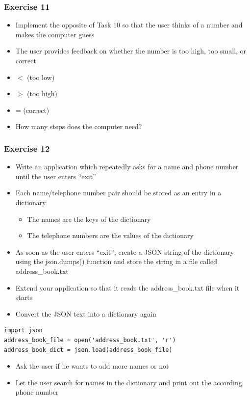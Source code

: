 \documentclass[10pt, a4paper]{beamer} %
\begin{document}
{\begin{frame}[c, fragile]
\end{frame}

\begin{frame}[c, fragile]\frametitle{Exercise 11}
    
    \begin{itemize}
        \item Implement the opposite of Task 10 so that the user thinks of a number and makes the computer guess
        \item The user provides feedback on whether the number is too high, too small, or correct
        \item $<$ (too low)
        \item $>$ (too high)
        \item = (correct)
        \item How many steps does the computer need?
    \end{itemize}
\end{frame}


\begin{frame}\frametitle{Exercise 12}
    
\begin{itemize}
\item Write an application which repeatedly asks for a name and phone
number until the user enters ``exit''
\item Each name/telephone number pair should be stored as an entry in a dictionary
\begin{itemize}
    \item The names are the keys of the dictionary
    \item The telephone numbers are the values of the dictionary
\end{itemize}
\item As soon as the user enters ``exit'', create a JSON string of the dictionary using the json.dumps() function and store the string in a file called address\_book.txt
\end{itemize}

\framebreak

\begin{itemize}
\item Extend your application so that it reads the address\_book.txt file when it starts
\item Convert the JSON text into a dictionary again
\end{itemize}

{
\mdseries
{}
\begin{lstlisting}
import json
address_book_file = open('address_book.txt', 'r')
address_book_dict = json.load(address_book_file)
\end{lstlisting}
}

\begin{itemize}
\item Ask the user if he wants to add more names or not
\item Let the user search for names in the dictionary and print out the according phone number
\end{itemize}

\end{frame}
}
\end{document}
